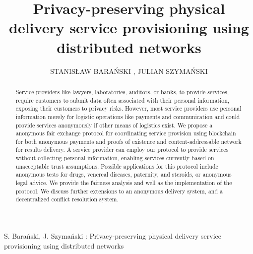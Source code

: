 \documentclass{ieeeaccess}
\begin{document}

\title{Privacy-preserving physical delivery service provisioning using distributed networks}
\author{\uppercase{Stanis\l{}aw Bara{\'n}ski} ,
\uppercase{Julian Szyma{\'n}ski } 
 }

\address[1]{Department of Electronic, Telecommunication and Informatics, Gdansk University of Technology, Narutowicza 11/12 Gdansk Poland (e-mail: stanislaw.baranski@pg.edu.pl, julian.szymanski@eti.pg.edu.pl}

 


{S. Bara{\'n}ski, J. Szyma{\'n}ski : 
Privacy-preserving physical delivery service provisioning using distributed networks}


\begin{abstract}
Service providers like lawyers, laboratories, auditors, or banks, to provide services, require customers to submit data often associated with their personal information, exposing their customers to privacy risks. However, most service providers use personal information merely for logistic operations like payments and communication and could provide services anonymously if other means of logistics exist.
We propose a anonymous fair exchange protocol for coordinating service provision using blockchain for both anonymous payments and proofs of existence and content-addressable network for results delivery.
A service provider can employ our protocol to provide services without collecting personal information, enabling services currently based on unacceptable trust assumptions. 
Possible applications for this protocol include anonymous tests for drugs, venereal diseases, paternity, and steroids, or anonymous legal advice.
We provide the fairness analysis and well as the implementation of the protocol. We discuss further extensions to an anonymous delivery system, and a decentralized conflict resolution system.
\end{abstract}
\end{document}
